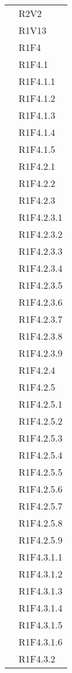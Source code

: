 \begin{longtable}{|>{\centering}m{5cm}|m{5cm}<{\centering}|}
&{R2V2}\\
&{R1V13}\\

&{R1F4}\\
&{R1F4.1}\\
&{R1F4.1.1}\\
&{R1F4.1.2}\\
&{R1F4.1.3}\\
&{R1F4.1.4}\\
&{R1F4.1.5}\\
&{R1F4.2.1}\\
&{R1F4.2.2}\\
&{R1F4.2.3}\\
&{R1F4.2.3.1}\\
&{R1F4.2.3.2}\\
&{R1F4.2.3.3}\\
&{R1F4.2.3.4}\\
&{R1F4.2.3.5}\\
&{R1F4.2.3.6}\\
&{R1F4.2.3.7}\\
&{R1F4.2.3.8}\\
&{R1F4.2.3.9}\\
&{R1F4.2.4}\\
&{R1F4.2.5}\\
&{R1F4.2.5.1}\\
&{R1F4.2.5.2}\\
&{R1F4.2.5.3}\\
&{R1F4.2.5.4}\\
&{R1F4.2.5.5}\\
&{R1F4.2.5.6}\\
&{R1F4.2.5.7}\\
&{R1F4.2.5.8}\\
&{R1F4.2.5.9}\\
&{R1F4.3.1.1}\\
&{R1F4.3.1.2}\\
&{R1F4.3.1.3}\\
&{R1F4.3.1.4}\\
&{R1F4.3.1.5}\\
&{R1F4.3.1.6}\\
&{R1F4.3.2}\\ \hline


\end{longtable}
